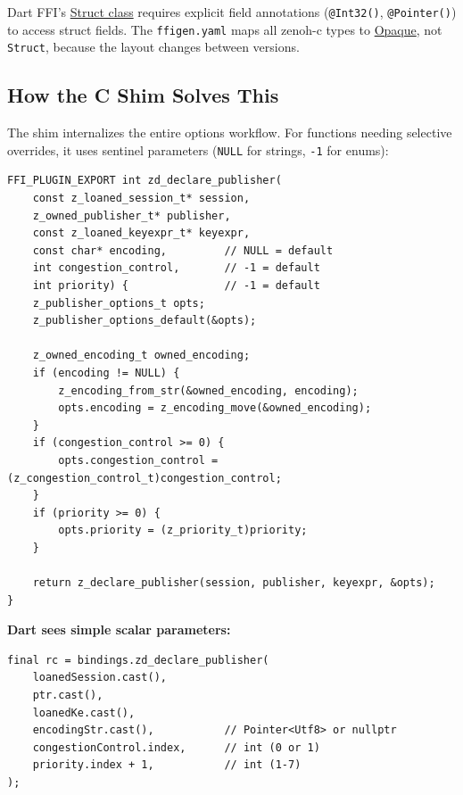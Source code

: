 \documentclass[11pt,a4paper]{article}
\newcommand{\code}[1]{\texttt{#1}}
\newcommand{\file}[1]{\texttt{#1}}
\newcommand{\fn}[1]{\texttt{#1}}
\begin{document}
Dart FFI's
\href{https://api.dart.dev/stable/latest/dart-ffi/Struct-class.html}{Struct class}
requires explicit field annotations (\code{@Int32()}, \code{@Pointer()})
to access struct fields. The \file{ffigen.yaml} maps all zenoh-c types to
\href{https://api.dart.dev/stable/latest/dart-ffi/Opaque-class.html}{Opaque},
not \code{Struct}, because the layout changes between versions.


\subsection{How the C Shim Solves This}

The shim internalizes the entire options workflow. For functions needing
selective overrides, it uses sentinel parameters (\code{NULL} for strings,
\code{-1} for enums):

\begin{lstlisting}[style=cstyle,caption={Sentinel-based optional parameters in \fn{zd\_declare\_publisher}}]
FFI_PLUGIN_EXPORT int zd_declare_publisher(
    const z_loaned_session_t* session,
    z_owned_publisher_t* publisher,
    const z_loaned_keyexpr_t* keyexpr,
    const char* encoding,         // NULL = default
    int congestion_control,       // -1 = default
    int priority) {               // -1 = default
    z_publisher_options_t opts;
    z_publisher_options_default(&opts);

    z_owned_encoding_t owned_encoding;
    if (encoding != NULL) {
        z_encoding_from_str(&owned_encoding, encoding);
        opts.encoding = z_encoding_move(&owned_encoding);
    }
    if (congestion_control >= 0) {
        opts.congestion_control = (z_congestion_control_t)congestion_control;
    }
    if (priority >= 0) {
        opts.priority = (z_priority_t)priority;
    }

    return z_declare_publisher(session, publisher, keyexpr, &opts);
}
\end{lstlisting}

\textbf{Dart sees simple scalar parameters:}

\begin{lstlisting}[style=dartstyle,caption={Dart invocation --- no options struct, no move functions}]
final rc = bindings.zd_declare_publisher(
    loanedSession.cast(),
    ptr.cast(),
    loanedKe.cast(),
    encodingStr.cast(),           // Pointer<Utf8> or nullptr
    congestionControl.index,      // int (0 or 1)
    priority.index + 1,           // int (1-7)
);
\end{lstlisting}
\end{document}
